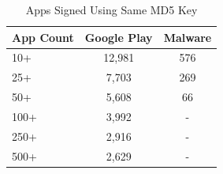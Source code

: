 \documentclass{sig-alternate-05-2015}
\begin{document}
\begin{table}[ht]
\begin{center}
\caption{Apps Signed Using Same MD5 Key}
\label{Table:md5Counts}
 \begin{tabular}{ | l | c | c | } \hline

	  \bfseries App Count & \bfseries   Google Play & \bfseries Malware \\ \hline



	
	10+ &	12,981	& 576 \\ \hline	
	25+	& 7,703	& 269 \\ \hline	
	50+	& 5,608	& 66 \\ \hline	
	100+ &	3,992	  & - \\ \hline	
	250+&	2,916	 & - \\ \hline	
	500+&	2,629	 & - \\ \hline	
	
	
	
        	 	
  \end{tabular}
\end{center}
\end{table}











%
%	
%
%        	 	
\end{document}

